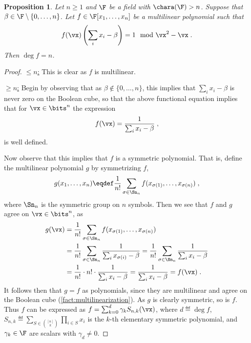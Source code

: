 \documentclass[11pt]{article}
\numberwithin{equation}{section}
\newtheorem{proposition}[theorem]{Proposition}
\theoremstyle{definition}
\theoremstyle{plain}
\begin{document}
\begin{proposition}\label{res:subsetsum:deg}
        Let $n\ge 1$ and $\F$ be a field with $\chara(\F)>n$.  Suppose that $\beta\in \F\setminus\{0,\ldots,n\}$. Let $f\in\F[x_1,\ldots,x_n]$ be a multilinear polynomial such that
        \[
                f(\vx)\left(\sum_i x_i-\beta\right)=1 \mod \vx^2-\vx
                \;.
        \]
        Then $\deg f=n$.
\end{proposition}
\begin{proof}
        \uline{$\le n$:} This is clear as $f$ is multilinear.

        \uline{$\ge n$:} Begin by observing that as $\beta\notin\{0,\ldots,n\}$, this implies that $\sum_i x_i-\beta$ is never zero on the Boolean cube, so that the above functional equation implies that for $\vx\in\bits^n$ the expression
        \begin{align*}
                f(\vx)= \frac{1}{\sum_i x_i-\beta}
                \;,
        \end{align*}
        is well defined.

        Now observe that this implies that $f$ is a symmetric polynomial.  That is, define the multilinear polynomial $g$ by symmetrizing $f$,
        \begin{align*}
                g(x_1,\ldots,x_n)\eqdef \frac{1}{n!}\sum_{\sigma\in\Sn_n} f(x_{\sigma(1)},\ldots,x_{\sigma(n)})
                \;,
        \end{align*}
        where $\Sn_n$ is the symmetric group on $n$ symbols.  Then we see that $f$ and $g$ agree on $\vx\in\bits^n$, as
        \begin{align*}
                g(\vx)
                &=\frac{1}{n!}\sum_{\sigma\in\Sn_n} f(x_{\sigma(1)},\ldots,x_{\sigma(n)})\\
                &=\frac{1}{n!}\sum_{\sigma\in\Sn_n} \frac{1}{\sum_i x_{\sigma(i)}-\beta}
                =\frac{1}{n!}\sum_{\sigma\in\Sn_n} \frac{1}{\sum_i x_i-\beta}\\
                &=\frac{1}{n!}\cdot n!\cdot \frac{1}{\sum_i x_i-\beta}
                =\frac{1}{\sum_i x_i-\beta}=f(\vx)
                \;.
        \end{align*}
        It follows then that $g=f$ as polynomials, since they are multilinear and agree on the Boolean cube (\autoref{fact:multilinearization}).  As $g$ is clearly symmetric, so is $f$. Thus $f$ can be expressed as $f=\sum_{k=0}^d \gamma_k S_{n,k}(\vx)$, where $d\eqdef\deg f$, $S_{n,k}\eqdef \sum_{S\in\binom{[n]}{k}}\prod_{i\in S} x_i$ is the $k$-th elementary symmetric polynomial, and $\gamma_k\in\F$ are scalars with $\gamma_d\ne 0$.


\end{proof}
\end{document}
